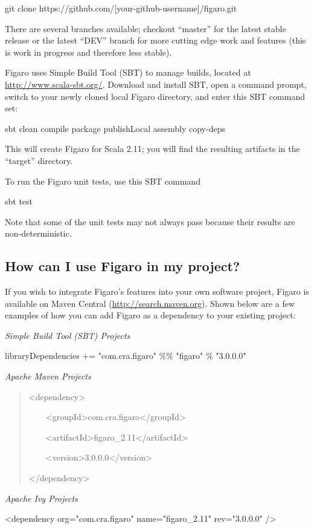 \documentclass[]{article}
\begin{document}
git clone https://github.com/{[}your-github-username{]}/figaro.git

There are several branches available; checkout ``master'' for the latest
stable release or the latest ``DEV'' branch for more cutting edge work
and features (this is work in progress and therefore less stable).

Figaro uses Simple Build Tool (SBT) to manage builds, located at
\url{http://www.scala-sbt.org/}. Download and install SBT, open a
command prompt, switch to your newly cloned local Figaro directory, and
enter this SBT command set:

sbt clean compile package publishLocal assembly copy-deps

This will create Figaro for Scala 2.11; you will find the resulting
artifacts in the ``target'' directory.

To run the Figaro unit tests, use this SBT command

sbt test

Note that some of the unit tests may not always pass because their
results are non-deterministic.

\subsection{How can I use Figaro in my
project?}\label{how-can-i-use-figaro-in-my-project}

If you wish to integrate Figaro's features into your own software
project, Figaro is available on Maven Central
(\url{http://search.maven.org}). Shown below are a few examples of how
you can add Figaro as a dependency to your existing project:

\emph{Simple Build Tool (SBT) Projects}

libraryDependencies += "com.cra.figaro" \%\% "figaro" \% "3.0.0.0"

\emph{Apache Maven Projects}

\begin{quote}
\textless{}dependency\textgreater{}

~~~~\textless{}groupId\textgreater{}com.cra.figaro\textless{}/groupId\textgreater{}

~~~~\textless{}artifactId\textgreater{}figaro\_2.11\textless{}/artifactId\textgreater{}

~~~~\textless{}version\textgreater{}3.0.0.0\textless{}/version\textgreater{}

\textless{}/dependency\textgreater{}
\end{quote}

\emph{Apache Ivy Projects}

\textless{}dependency org="com.cra.figaro" name="figaro\_2.11"
rev="3.0.0.0" /\textgreater{}
\end{document}
